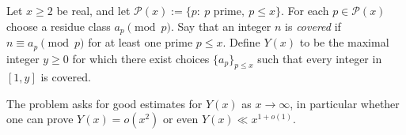 Let $x\ge 2$ be real, and let $\mathcal P(x):=\{p:\ p\text{ prime},\ p\le x\}$.
For each $p\in\mathcal P(x)$ choose a residue class $a_p\pmod p$.
Say that an integer $n$ is \emph{covered} if $n\equiv a_p\pmod p$ for at least one prime $p\le x$.
Define $Y(x)$ to be the maximal integer $y\ge 0$ for which there exist choices $\{a_p\}_{p\le x}$ such that every integer in $[1,y]$
is covered.

The problem asks for good estimates for $Y(x)$ as $x\to\infty$, in particular whether one can prove $Y(x)=o(x^2)$
or even $Y(x)\ll x^{1+o(1)}$.
